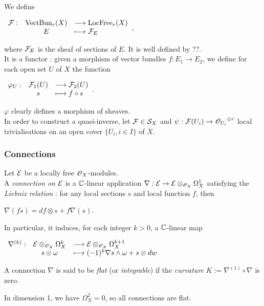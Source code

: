 \begin{mydemo}
We define 
\begin{center}
$\displaystyle \begin{array}{rcll} \mathcal{F} : & \text{VectBun}_r(X) & \longrightarrow \text{LocFree}_r(X) \\ & E & \longmapsto \mathcal{F}_E \end{array}$,
\end{center}
where $\mathcal{F}_E$ is the sheaf of sections of $E$. It is well defined by ??.\\
It is a functor : given a morphism of vector bundles $f:E_1 \to E_2$, we define for each open set $U$ of $X$ the function
\begin{center}
$\displaystyle \begin{array}{rcll} \varphi_U : & \mathcal{F}_1(U) & \longrightarrow \mathcal{F}_2(U) \\ & s & \longmapsto f\circ s \end{array}$.
\end{center}
$\varphi$ clearly defines a morphism of sheaves.\\
In order to construct a quasi-inverse, let $\mathcal{F} \in \mathcal{S}_X$ and $\psi : \sheaf(U_i) \to \holo_{U_i}{\vphantom{\holo}}^{\oplus r}$ local trivialisations on an open cover $\{U_i,i \in I\}$ of $X$.
\end{mydemo}


\subsubsection{Connections}

\begin{mydef}
Let $\mathcal{E}$ be a locally free $\mathscr{O}_X$-modules.\\
A \textit{connection on $\mathcal{E}$} is a $\mathbb{C}$-linear application $\nabla : \mathcal{E} \to \mathcal{E} \otimes_{\mathscr{O}_X} \Omega_X^1$ satisfying the \textit{Liebniz relation} : for any local sections $s$ and local function $f$, then
\begin{center}
$\nabla(fs) = df \otimes s + f\nabla(s)$.
\end{center}
In particular, it induces, for each integer $k >0$, a $\mathbb{C}$-linear map
\begin{center}
$\displaystyle \begin{array}{rcll} \nabla^{(k)} : & \mathcal{E} \otimes_{\mathscr{O}_X} \Omega_X^k & \longrightarrow \mathcal{E} \otimes_{\mathscr{O}_X} \Omega_X^{k+1} \\ & s \otimes \omega & \longmapsto (-1)^k\nabla s \wedge \omega + s \otimes dw \end{array}$
\end{center}
A connection $\nabla$ is said to be \textit{flat} (or \textit{integrable}) if the \textit{curvature} $K := \nabla^{(1)} \circ \nabla$ is zero.
\end{mydef}

\begin{myrem}
In dimension 1, we have $\Omega_X^2 = 0$, so all connections are flat.
\end{myrem}

